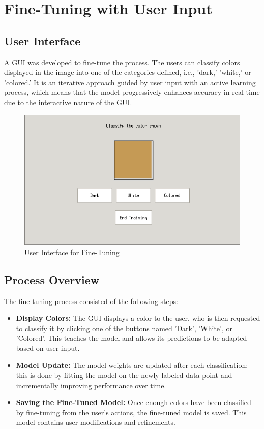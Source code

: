 \documentclass{article}
\begin{document}
\section{Fine-Tuning with User Input}

\subsection{User Interface}
A GUI was developed to fine-tune the process. The users can classify colors displayed in the image into one of the categories defined, i.e., 'dark,' 'white,' or 'colored.' It is an iterative approach guided by user input with an active learning process, which means that the model progressively enhances accuracy in real-time due to the interactive nature of the GUI.

\begin{figure}[H]
\centering
\includegraphics[width=\textwidth]{pictures/user_fine_tuning_GUI.png}
\caption{User Interface for Fine-Tuning}
\label{fig
}
\end{figure}

\subsection{Process Overview}
The fine-tuning process consisted of the following steps:

\begin{itemize}
\item \textbf{Display Colors:} The GUI displays a color to the user, who is then requested to classify it by clicking one of the buttons named 'Dark', 'White', or 'Colored'. This teaches the model and allows its predictions to be adapted based on user input.
\item \textbf{Model Update:} The model weights are updated after each classification; this is done by fitting the model on the newly labeled data point and incrementally improving performance over time.
\item \textbf{Saving the Fine-Tuned Model:} Once enough colors have been classified by fine-tuning from the user's actions, the fine-tuned model is saved. This model contains user modifications and refinements.
\end{itemize}
\end{document}
